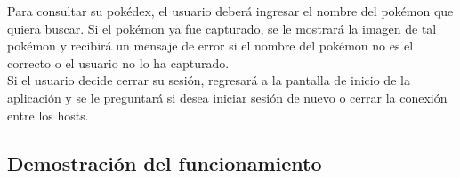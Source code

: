 \documentclass[12pt]{article}
\begin{document}
Para consultar su pokédex, el usuario deberá ingresar el nombre del pokémon que quiera buscar. Si el pokémon ya fue capturado, se le mostrará la imagen de tal pokémon y recibirá un mensaje de error si el nombre del pokémon no es el correcto o el usuario no lo ha capturado. \\

Si el usuario decide cerrar su sesión, regresará a la pantalla de inicio de la aplicación y se le preguntará si desea iniciar sesión de nuevo o cerrar la conexión entre los hosts. \\

\subsection{Demostración del funcionamiento}
\end{document}
